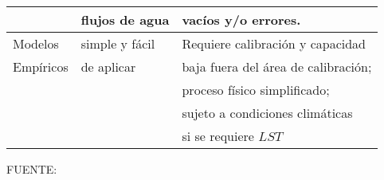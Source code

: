 \begin{longtable}{l|l|l}
                & flujos de agua           & vacíos y/o errores.                  \\ \hline
Modelos         & simple y fácil           & Requiere calibración y capacidad     \\
Empíricos       & de aplicar               & baja fuera del área de calibración; \\
                &                          & proceso físico simplificado;      \\
                &                          & sujeto a condiciones climáticas     \\
                &                          & si se requiere $LST$                   \\ \hline
\end{longtable}
\vspace*{-1.25cm}
FUENTE: \citet{zhang2016review}


